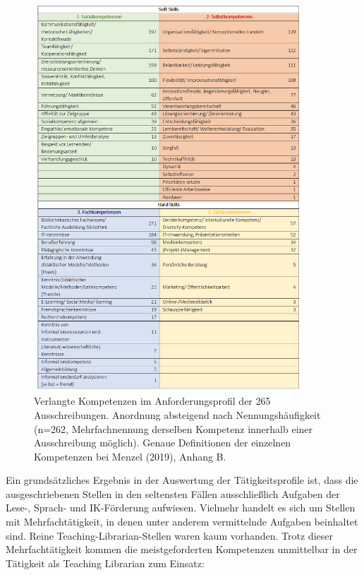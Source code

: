 \documentclass[a4paper,
fontsize=11pt,
oneside,
numbers=noperiodatend,
parskip=half-,
bibliography=totoc,
final
]{scrartcl}
\begin{document}
\begin{figure}
\centering
\includegraphics[width=0.9\textwidth]{img/image3.png}
\caption[Verlangte Kompetenzen im Anforderungsprofil der 265
Ausschreibungen. Anordnung absteigend nach Nennungshäufigkeit (n=262,
Mehrfachnennung derselben Kompetenz innerhalb einer Ausschreibung
möglich). Genaue Definitionen der einzelnen Kompetenzen bei Menzel
(2019), Anhang B. ]{Verlangte Kompetenzen im Anforderungsprofil der 265
Ausschreibungen. Anordnung absteigend nach Nennungshäufigkeit (n=262,
Mehrfachnennung derselben Kompetenz innerhalb einer Ausschreibung
möglich). Genaue Definitionen der einzelnen Kompetenzen bei Menzel
(2019), Anhang B. \footnotemark{}}
\end{figure}

Ein grundsätzliches Ergebnis in der Auswertung der Tätigkeitsprofile
ist, dass die ausgeschriebenen Stellen in den seltensten Fällen
ausschließlich Aufgaben der Lese-, Sprach- und IK-För\-derung aufwiesen.
Vielmehr handelt es sich um Stellen mit Mehrfachtätigkeit, in denen
unter anderem vermittelnde Aufgaben beinhaltet sind. Reine
Teaching-Librarian-Stellen waren kaum vorhanden. Trotz dieser
Mehrfachtätigkeit kommen die meistgeforderten Kompetenzen unmittelbar in
der Tätigkeit als Teaching Librarian zum Einsatz:
\end{document}

